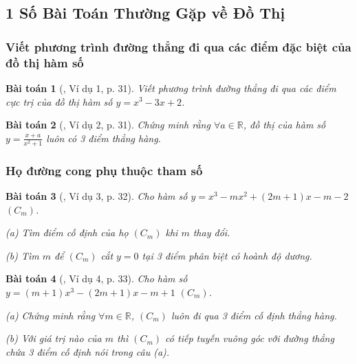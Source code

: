 \documentclass[12pt]{article}
\numberwithin{equation}{section}
\newtheorem{baitoan}{Bài toán}[section]
\begin{document}

\subsection{1 Số Bài Toán Thường Gặp về Đồ Thị}

\subsubsection{Viết phương trình đường thẳng đi qua các điểm đặc biệt của đồ thị hàm số}

\begin{baitoan}[\cite{TL_chuyen_Toan_Giai_Tich_12}, Ví dụ 1, p. 31]
	Viết phương trình đường thẳng đi qua các điểm cực trị của đồ thị hàm số $y = x^3 - 3x + 2$.
\end{baitoan}

\begin{baitoan}[\cite{TL_chuyen_Toan_Giai_Tich_12}, Ví dụ 2, p. 31]
	Chứng minh rằng $\forall a\in\mathbb{R}$, đồ thị của hàm số $y = \frac{x + a}{x^2 + 1}$ luôn có 3 điểm thẳng hàng.
\end{baitoan}

\subsubsection{Họ đường cong phụ thuộc tham số}

\begin{baitoan}[\cite{TL_chuyen_Toan_Giai_Tich_12}, Ví dụ 3, p. 32]
	Cho hàm số $y = x^3 - mx^2 + (2m + 1)x - m - 2$ $(C_m)$.
	\begin{enumerate*}
		\item[(a)] Tìm điểm cố định của họ $(C_m)$ khi $m$ thay đổi.
		\item[(b)] Tìm $m$ để $(C_m)$ cắt $y = 0$ tại 3 điểm phân biệt có hoành độ dương.
	\end{enumerate*}
\end{baitoan}

\begin{baitoan}[\cite{TL_chuyen_Toan_Giai_Tich_12}, Ví dụ 4, p. 33]
	Cho hàm số $y = (m + 1)x^3 - (2m + 1)x - m + 1$ $(C_m)$.
	\begin{enumerate*}
		\item[(a)] Chứng minh rằng $\forall m\in\mathbb{R}$, $(C_m)$ luôn đi qua 3 điểm cố định thẳng hàng.
		\item[(b)] Với giá trị nào của $m$ thì $(C_m)$ có tiếp tuyến vuông góc với đường thẳng chứa 3 điểm cố định nói trong câu (a).
	\end{enumerate*}
\end{baitoan}
\end{document}

